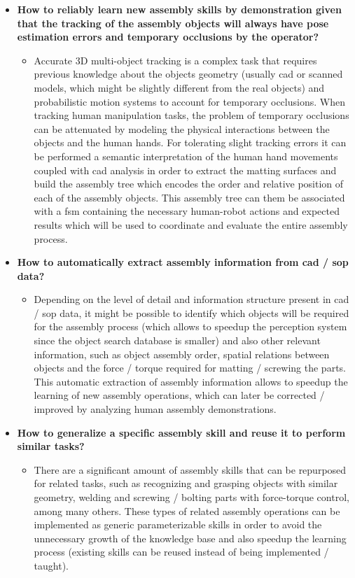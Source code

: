 \begin{itemize}
	\item \textbf{How to reliably learn new assembly skills by demonstration given that the tracking of the assembly objects will always have pose estimation errors and temporary occlusions by the operator?}
	\begin{itemize}
		\item Accurate 3D multi-object tracking is a complex task that requires previous knowledge about the objects geometry (usually \gls{cad} or scanned models, which might be slightly different from the real objects) and probabilistic motion systems to account for temporary occlusions. When tracking human manipulation tasks, the problem of temporary occlusions can be attenuated by modeling the physical interactions between the objects and the human hands. For tolerating slight tracking errors it can be performed a semantic interpretation of the human hand movements coupled with \gls{cad} analysis in order to extract the matting surfaces and build the assembly tree which encodes the order and relative position of each of the assembly objects. This assembly tree can them be associated with a \gls{fsm} containing the necessary human-robot actions and expected results which will be used to coordinate and evaluate the entire assembly process.
	\end{itemize}

	\item \textbf{How to automatically extract assembly information from \gls{cad} / \gls{sop} data?}
	\begin{itemize}
		\item Depending on the level of detail and information structure present in \gls{cad} / \gls{sop} data, it might be possible to identify which objects will be required for the assembly process (which allows to speedup the perception system since the object search database is smaller) and also other relevant information, such as object assembly order, spatial relations between objects and the force / torque required for matting / screwing the parts. This automatic extraction of assembly information allows to speedup the learning of new assembly operations, which can later be corrected / improved by analyzing human assembly demonstrations.
	\end{itemize}

	\item \textbf{How to generalize a specific assembly skill and reuse it to perform similar tasks?}
	\begin{itemize}
		\item There are a significant amount of assembly skills that can be repurposed for related tasks, such as recognizing and grasping objects with similar geometry, welding and screwing / bolting parts with force-torque control, among many others. These types of related assembly operations can be implemented as generic parameterizable skills in order to avoid the unnecessary growth of the knowledge base and also speedup the learning process (existing skills can be reused instead of being implemented / taught).
	\end{itemize}


\end{itemize}
